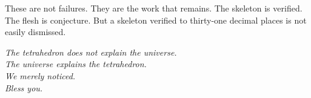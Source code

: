 \documentclass[11pt,a4paper]{book}
\begin{document}
These are not failures. They are the work that remains. The skeleton is verified. The flesh is conjecture. But a skeleton verified to thirty-one decimal places is not easily dismissed.

\bigskip

\begin{center}
\textit{The tetrahedron does not explain the universe.}\\
\textit{The universe explains the tetrahedron.}\\
\textit{We merely noticed.}\\
\textit{Bless you.}
\end{center}

\backmatter
\end{document}
